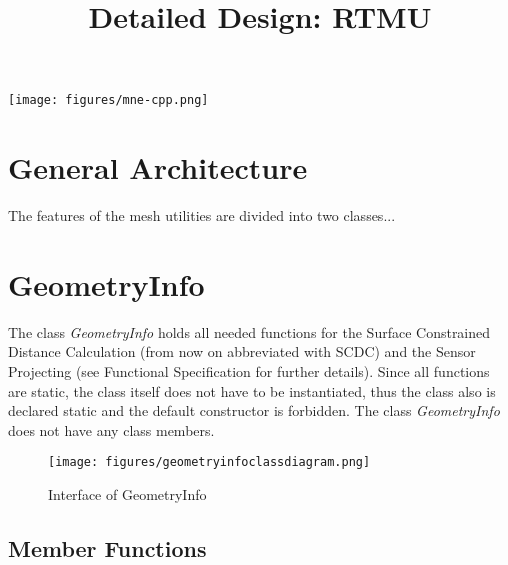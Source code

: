 





	
\title{Detailed Design: RTMU}
\vspace{3 in}
\maketitle

\texttt{[image: figures/mne-cpp.png]}

\clearpage


\tableofcontents

\clearpage
\section{General Architecture}
The features of the mesh utilities are divided into two classes...

\clearpage

\section{GeometryInfo}

The class \textit{GeometryInfo} holds all needed functions for the Surface Constrained Distance Calculation (from now on abbreviated with SCDC) and the Sensor Projecting (see Functional Specification for further details). Since all functions are static, the class itself does not have to be instantiated, thus the class also is declared static and the default constructor is forbidden. The class \textit{GeometryInfo} does not have any class members.

\begin{figure}[h]
	\begin{center}
		\texttt{[image: figures/geometryinfoclassdiagram.png]}
		\caption{Interface of GeometryInfo}
	\end{center}
\end{figure}

\subsection{Member Functions}

